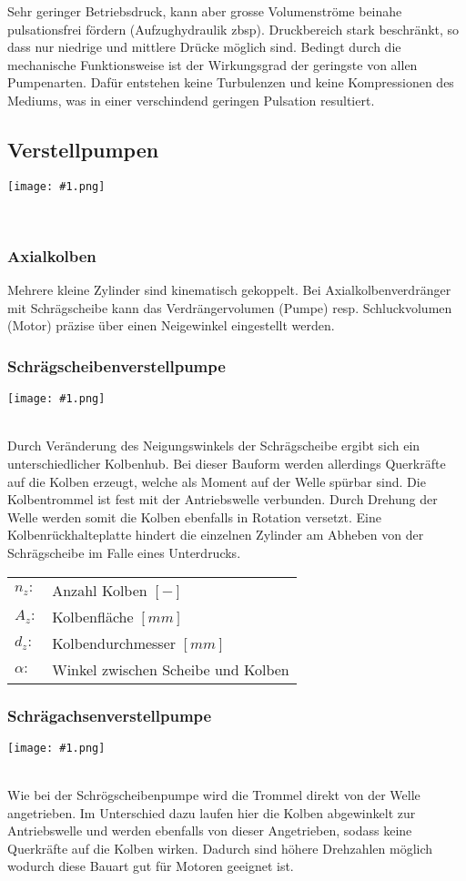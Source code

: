\documentclass[landscape,a4paper,10pt]{article}
\newcommand{\graphiccol}[1]{
\noindent
\begin{minipage}{\columnwidth}
\centering
\texttt{[image: \#1.png]}
\end{minipage}
\medskip \\
}
\begin{document}
\begin{multicols*}{3}
Sehr geringer Betriebsdruck, kann aber grosse Volumenströme beinahe pulsationsfrei fördern (Aufzughydraulik zbsp). 
Druckbereich stark beschränkt, so dass nur niedrige und mittlere Drücke möglich sind. Bedingt durch die mechanische Funktionsweise ist der Wirkungsgrad der geringste von allen Pumpenarten. Dafür entstehen keine Turbulenzen und keine Kompressionen des Mediums, was in einer verschindend geringen Pulsation resultiert. 



\subsection{Verstellpumpen}
\graphiccol{verstellpumpen}

\subsubsection{Axialkolben}
Mehrere kleine Zylinder sind kinematisch gekoppelt. Bei Axialkolbenverdränger mit Schrägscheibe kann das Verdrängervolumen (Pumpe) resp. Schluckvolumen (Motor) präzise über einen Neigewinkel eingestellt werden.

\subsubsection{Schrägscheibenverstellpumpe}
\graphiccol{schraegscheibenverstellpumpe}
Durch Veränderung des Neigungswinkels der Schrägscheibe ergibt sich ein unterschiedlicher Kolbenhub. Bei dieser Bauform werden allerdings Querkräfte auf die Kolben erzeugt, welche als Moment auf der Welle spürbar sind. Die Kolbentrommel ist fest mit der Antriebswelle verbunden. Durch Drehung der Welle werden somit die Kolben ebenfalls in Rotation versetzt. Eine Kolbenrückhalteplatte hindert die einzelnen Zylinder am Abheben von der Schrägscheibe im Falle eines Unterdrucks. 

\begin{tabular}{ll}
$n_z:$ & Anzahl Kolben $[-]$ \\
$A_z:$ & Kolbenfläche $[mm]$ \\
$d_z:$ & Kolbendurchmesser $[mm]$ \\
$\alpha: $ & Winkel zwischen Scheibe und Kolben
\end{tabular}


\subsubsection{Schrägachsenverstellpumpe}
\graphiccol{schraegachsenverstellpumpe}
Wie bei der Schrögscheibenpumpe wird die Trommel direkt von der Welle angetrieben. Im Unterschied dazu laufen hier die Kolben abgewinkelt zur Antriebswelle und werden ebenfalls von dieser Angetrieben, sodass keine Querkräfte auf die Kolben wirken. Dadurch sind höhere Drehzahlen möglich wodurch diese Bauart gut für Motoren geeignet ist. 



\end{multicols*}
\end{document}
